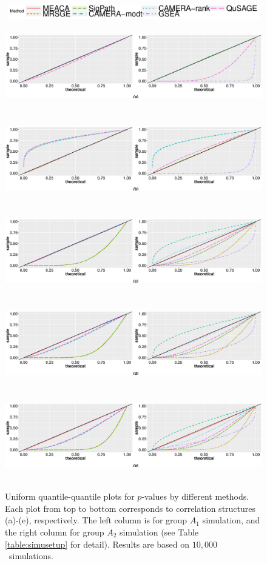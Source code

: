 \documentclass[a4,center,fleqn]{NAR}
\newcommand{\aaCase}{a}
\newcommand{\fCase}{e}
\newcommand{\HowmanySimu}{$10,000$}
\begin{document}
	
	\begin{figure}[!ht]
		\begin{center}
			\includegraphics[width=20cm,height=0.6cm]{Figures/parallel_legend.eps}
			\includegraphics[width=17cm,height=3.9cm]{Figures/parallel_a.eps}
			\includegraphics[width=17cm,height=3.9cm]{Figures/parallel_b.eps}
			\includegraphics[width=17cm,height=3.9cm]{Figures/parallel_c.eps}
			\includegraphics[width=17cm,height=3.9cm]{Figures/parallel_d.eps}
			\includegraphics[width=17cm,height=3.9cm]{Figures/parallel_e.eps}
		\end{center} 
		\caption[Uniform quantile-quantile plots for $p$-values by different methods]{Uniform 
			quantile-quantile plots for $p$-values by different methods. Each plot 
			from top to bottom corresponds to correlation structures (\aaCase)-(\fCase), 
			respectively. 
			The left column is for group $A_1$ simulation, and the right column for group $A_2$ 
			simulation (see Table \ref{table:simusetup} for detail). Results are based on
			\HowmanySimu~simulations.}\label{fig:typeIerror}
	\end{figure} 
\end{document}
